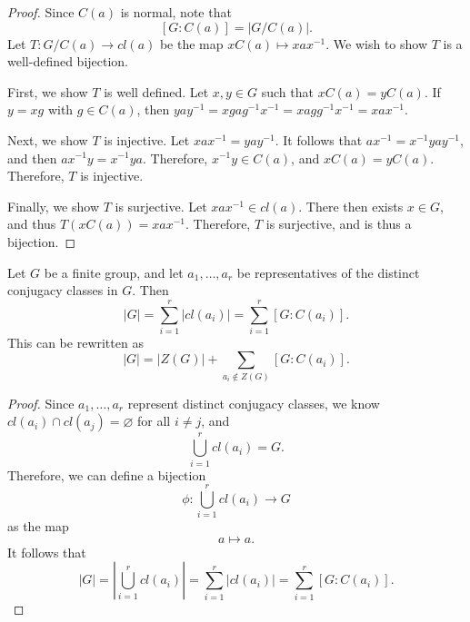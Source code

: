 \begin{proof}
	Since $C(a)$ is normal, note that
	\[
		\left[ G : C(a) \right] =\left| G / C(a) \right| 
	.\]
	Let $T : G / C(a) \to cl(a)$ be the map $xC(a) \mapsto xax ^{-1}$. We wish to show $T$ is a well-defined bijection.

	First, we show $T$ is well defined. Let $x,y\in G$ such that $xC(a)=yC(a)$. If $y=xg$ with $g\in C(a)$, then $yay^{-1}=xgag^{-1}x ^{-1}=xagg^{-1}x ^{-1}=xax ^{-1}$.

	Next, we show $T$ is injective. Let $xax ^{-1}=yay^{-1}$. It follows that $ax ^{-1}=x ^{-1}yay^{-1}$, and then $ax ^{-1}y=x ^{-1}ya$. Therefore, $x ^{-1}y\in C(a)$, and $xC(a)=yC(a)$. Therefore, $T$ is injective.

	Finally, we show $T$ is surjective. Let $xax ^{-1}\in cl(a)$. There then exists $x\in G$, and thus $T(xC(a))=xax ^{-1}$. Therefore, $T$ is surjective, and is thus a bijection.
\end{proof}
\begin{theorem}\label{thm:hiii}
	Let $G$ be a finite group, and let $a_1, \dots, a_r $ be representatives of the distinct conjugacy classes in $G$. Then
	\[
		\left| G \right| =\sum_{i=1}^{r} \left| cl\left( a_i \right)  \right| = \sum_{i=1}^{r} \left[ G : C\left( a_i \right)  \right] 
	.\]
	This can be rewritten as
	\[
		\left| G \right| =\left| Z(G) \right| +\sum_{a_i\notin Z(G)} \left[ G : C\left( a_i \right)  \right]  
	.\]
\end{theorem}
\begin{proof}
	Since $a_1, \dots, a_r$ represent distinct conjugacy classes, we know $cl(a_i)\cap cl(a_j)=\varnothing$ for all $i\neq j$, and
	\[
		\bigcup_{i=1}^{r} cl(a_i)=G
	.\]
	Therefore, we can define a bijection
	\[
		\phi : \bigcup_{i=1}^{r} cl(a_i) \to G
	\]
	as the map
	\[
		a\mapsto a
	.\]
	It follows that
	\[
		\left| G \right| =\left| \bigcup_{i=1}^{r} cl(a_i) \right| =\sum_{i=1}^{r} \left| cl(a_i) \right| =\sum_{i=1}^{r} \left[ G : C(a_i) \right] 
	.\]
\end{proof}
